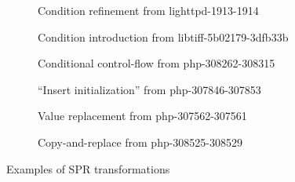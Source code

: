 \begin{figure}[t!]

\begin{subfigure}[b]{\linewidth}
    
    \vspace{-0.1in}
    \caption{Condition refinement from lighttpd-1913-1914}
\end{subfigure}

\begin{subfigure}[b]{\linewidth}
    
    \vspace{-0.1in}
    \caption{Condition introduction from libtiff-5b02179-3dfb33b}
\end{subfigure}

\begin{subfigure}[b]{\linewidth}
    
    \vspace{-0.1in}
    \caption{Conditional control-flow from php-308262-308315}
\end{subfigure}

\begin{subfigure}[b]{\linewidth}
    
    \vspace{-0.1in}
    \caption{``Insert initialization'' from php-307846-307853}
\end{subfigure}

\begin{subfigure}[b]{\linewidth}
    
    \vspace{-0.1in}
    \caption{Value replacement from php-307562-307561}
\end{subfigure}

\begin{subfigure}[b]{\linewidth}
    
    \vspace{-0.1in}
    \caption{Copy-and-replace from php-308525-308529}
\end{subfigure}

\vspace{0.1in}
\small \caption{Examples of SPR transformations}
    \label{figure:spr-repairs}
\vspace{-0.2in}
\end{figure}

